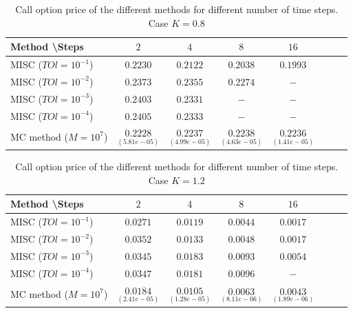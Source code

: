 \documentclass[11pt]{article}
\begin{document}
\begin{table}[h!]
	\centering
	\begin{tabular}{l*{6}{c}r}
		Method \textbackslash  Steps            & $2$ & $4$ & $8$ & $16$  \\
		\hline
		MISC ($TOl=10^{-1}$)  & $0.2230$ & $0.2122$ &  $0.2038$ &  $0.1993$  \\
		MISC ($TOl=10^{-2}$)  &  $0.2373$ &  $0.2355$ &  $0.2274$ & $ -$  \\
		MISC ($TOl=10^{-3}$)        &  $0.2403$ & $0.2331$ &   $-$ &  $-$ \\
		MISC ($TOl=10^{-4}$)    &  $0.2405$ &  $0.2333$  & $-$ & $-$  \\
		MC method ($M=10^{7}$)   & $\underset{(5.81e-05)}{0.2228}$ & $ \underset{(4.99e-05)}{0.2237}$  & $ \underset{(4.63e-05)}{0.2238}$ & $\underset{(1.41e-05)}{0.2236}$ \\		
		\hline
	\end{tabular}
	\caption{ Call option price of the different methods for different number of time steps. Case $K=0.8$}
	\label{table: Call option price of the different methods for different number of time steps. Case $K=0.8$}
\end{table}


\begin{table}[h!]
	\centering
	\begin{tabular}{l*{6}{c}r}
		Method \textbackslash  Steps            & $2$ & $4$ & $8$ & $16$  \\
		\hline
		MISC ($TOl=10^{-1}$)  & $0.0271$ & $0.0119$ &  $0.0044$ &  $0.0017$  \\
		MISC ($TOl=10^{-2}$)  &  $0.0352$ &  $0.0133$ &  $0.0048$ & $0.0017$  \\
		MISC ($TOl=10^{-3}$)        &  $0.0345$ & $0.0183$ &   $0.0093$ &  $0.0054$ \\
		MISC ($TOl=10^{-4}$)    &  $0.0347$ &  $0.0181$  & $0.0096$ & $-$  \\
		MC method ($M=10^{7}$)   & $\underset{(2.41e-05)}{0.0184}$ & $ \underset{(1.28e-05)}{0.0105}$  & $\underset{(8.11e-06)}{0.0063}$ & $\underset{(1.89e-06)}{0.0043}$  \\	
		\hline
	\end{tabular}
	\caption{ Call option price of the different methods for different number of time steps. Case $K=1.2$}
	\label{table: Call option price of the different methods for different number of time steps. Case $K=1.2$}
\end{table}
\end{document}

